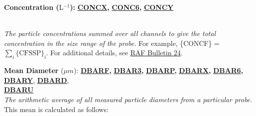 \begin{hangparagraphs}
\begin{singlespace}
\begin{minipage}[t]{1\columnwidth}
\begin{hangparagraphs}
\begin{singlespace}
\textbf{Concentration (}L\textbf{$^{-1}$):}\hypertarget{CONCX}{}\hypertarget{CONC6}{}\hypertarget{CONCY}{}\textbf{
}\textbf{\uline{CONCX}}\textbf{,
}\textbf{\uline{CONC6}}\textbf{,
}\textbf{\uline{CONCY}}
\end{singlespace}
\end{hangparagraphs}

%
\end{minipage}\textbf{}\\
\emph{The particle concentrations}
\emph{summed over all channels to give the total concentration in
the size range of the probe.} For example, \{CONCF\} = $\sum_{i}\mathrm{\{CFSSP\}_{i}}$.
For additional details, see \href{http://www.eol.ucar.edu/raf/Bulletins/bulletin24.html}{RAF Bulletin 24}.\\

\end{singlespace}

\textbf{Mean Diameter }($\mu m$):\hypertarget{DBARF}{}\hypertarget{DBAR3}{}\hypertarget{DBARP}{}\hypertarget{DBARX}{}\hypertarget{DBAR6}{}\hypertarget{DBARY}{}\hypertarget{DBARD}{}\hypertarget{DBARU}{}\textbf{
}\textbf{\uline{DBARF}}\textbf{, }\textbf{\uline{DBAR3}}\textbf{,
}\textbf{\uline{DBARP}}\textbf{, }\textbf{\uline{DBARX}}\textbf{,
}\textbf{\uline{DBAR6}}\textbf{, }\textbf{\uline{DBARY}},
\textbf{\uline{DBARD}}, \textbf{\uline{}}\\
\textbf{\uline{DBARU}}\\
\emph{The arithmetic average of all measured particle diameters from
a particular probe.}
This mean is calculated as follows: \\
\\
\end{hangparagraphs}
